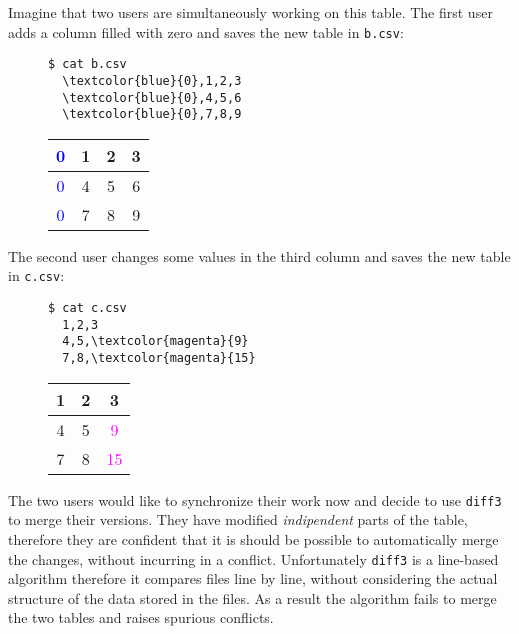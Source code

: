 \documentclass[preprint]{sigplanconf}
\theoremstyle{plain}
\begin{document}
Imagine that two users are simultaneously working on this table.
The first user adds a column filled with zero and saves the new table in \texttt{b.csv}:
\begin{figure}[h]
\centering
\begin{minipage}{.15\textwidth}
  \centering
\begin{Verbatim}[commandchars=\\\{\}]
  $ cat b.csv
  \textcolor{blue}{0},1,2,3
  \textcolor{blue}{0},4,5,6
  \textcolor{blue}{0},7,8,9
\end{Verbatim}
\end{minipage}%
\begin{minipage}{.15\textwidth}
  \centering
  \begin{tabular}{ | c | c | c | c | }
    \hline
    \textcolor{blue}{0} & 1 & 2 & 3 \\ \hline
    \textcolor{blue}{0} & 4 & 5 & 6 \\ \hline
    \textcolor{blue}{0} & 7 & 8 & 9  \\ \hline
  \end{tabular}
\end{minipage}%
\end{figure} 

The second user changes some values in the third column and saves the new table in  \texttt{c.csv}:
\begin{figure}[h]
\centering
\begin{minipage}{.15\textwidth}
  \centering
  \begin{Verbatim}[commandchars=\\\{\}]
  $ cat c.csv
  1,2,3
  4,5,\textcolor{magenta}{9}
  7,8,\textcolor{magenta}{15}
  \end{Verbatim}
\end{minipage}%
\begin{minipage}{.15\textwidth}
  \centering
  \begin{tabular}{ | c | c | c | }
    \hline
    1 & 2 & 3 \\ \hline
    4 & 5 & \textcolor{magenta}{9} \\ \hline
    7 & 8 & \textcolor{magenta}{15} \\ \hline
  \end{tabular}
\end{minipage}%
\end{figure}

The two users would like to synchronize their work now and decide to use 
\texttt{diff3} to merge their versions. They have modified \emph{indipendent} parts of the table, therefore they are confident that it is should be possible to automatically merge the changes, without incurring in a conflict.
Unfortunately \texttt{diff3} is a line-based algorithm therefore it compares files line by line, without considering the actual structure of the data stored in the files. As a result the algorithm fails to merge the two tables and raises spurious conflicts.
\end{document}
